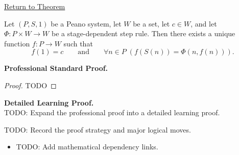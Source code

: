 \newpage
{}
\label{prf:general-recursion-theorem-for-peano-system}

\begin{remark*}[Return]
\hyperref[thm:general-recursion-theorem-for-peano-system]{Return to Theorem}
\end{remark*}

\begin{theorem*}
Let $(P,S,1)$ be a Peano system, let $W$ be a set, let $c\in W$, and let
$\Phi:P\times W\to W$ be a stage-dependent step rule. Then there exists a
unique function $f:P\to W$ such that
\[
f(1)=c
\qquad\text{and}\qquad
\forall n\in P\;(f(S(n))=\Phi(n,f(n))).
\]
\end{theorem*}

\textbf{Professional Standard Proof.}~\\
\begin{proof}
TODO
\end{proof}

\textbf{Detailed Learning Proof.}~\\
TODO: Expand the professional proof into a detailed learning proof.

\begin{remark*}
TODO: Record the proof strategy and major logical moves.
\end{remark*}

\begin{dependencies}
\begin{itemize}
  \item TODO: Add mathematical dependency links.
\end{itemize}
\end{dependencies}
